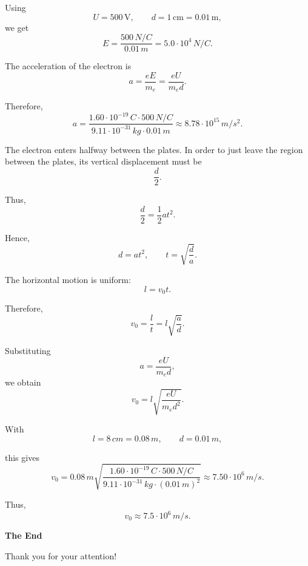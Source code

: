 \documentclass[t,aspectratio=169]{beamer}
\begin{document}
\begin{frame}
\begin{itemize}
\begin{enumerate}
Using
$$ U = 500\,\mathrm{V}, \qquad d = 1\,\mathrm{cm} = 0.01\,\mathrm{m}, $$
we get
$$ E = \frac{500\,N/C}{0.01\,m} = 5.0 \cdot 10^4\,{N/C}. $$

The acceleration of the electron is
$$ a = \frac{eE}{m_e} = \frac{eU}{m_e d}. $$

\pagebreak
Therefore,
$$ a = \frac{ 1.60 \cdot 10^{-19}\,C \cdot 500\,N/C} {9.11 \cdot 10^{-31}\,kg \cdot 0.01\,m} \approx 8.78 \cdot 10^{15}\,{m/s^2}. $$

The electron enters halfway between the plates. In order to just leave the region
between the plates, its vertical displacement must be
$$ \frac{d}{2}. $$

Thus,
$$ \frac{d}{2} = \frac{1}{2}at^2. $$

Hence,
$$ d = at^2, \qquad t = \sqrt{\frac{d}{a}}.$$

\pagebreak
The horizontal motion is uniform:
$$ l = v_0 t. $$

Therefore,
$$ v_0 = \frac{l}{t} = l\sqrt{\frac{a}{d}}. $$

Substituting
$$ a = \frac{eU}{m_e d}, $$
we obtain
$$ v_0 = l\sqrt{ \frac{eU}{m_e d^2} }.$$

With
$$ l = 8\,{cm} = 0.08\,{m}, \qquad d = 0.01\,{m}, $$

\pagebreak
this gives
$$ v_0 = 0.08\,m \sqrt{ \frac{ 1.60 \cdot 10^{-19}\,C \cdot 500\,N/C }{9.11 \cdot 10^{-31}\,kg \cdot (0.01\,m)^2 }}\approx 7.50 \cdot 10^6\,{m/s}.$$

Thus,
$$ \boxed{ v_0 \approx 7.5 \cdot 10^6\,{m/s} }.$$

\end{enumerate}


\end{itemize}

\end{frame}


\begin{frame}

\vfill
\begin{center}
\textbf{\huge The End}

\bigskip
Thank you for your attention!
\end{center}
\vfill
\end{frame}
\end{document}
